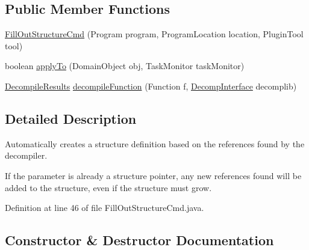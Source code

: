 \subsection*{Public Member Functions}
\begin{DoxyCompactItemize}
\item 
\mbox{\hyperlink{classghidra_1_1app_1_1plugin_1_1core_1_1decompile_1_1actions_1_1_fill_out_structure_cmd_a8bf54e2766774f1e16f1efac916bb947}{Fill\+Out\+Structure\+Cmd}} (Program program, Program\+Location location, Plugin\+Tool tool)
\item 
boolean \mbox{\hyperlink{classghidra_1_1app_1_1plugin_1_1core_1_1decompile_1_1actions_1_1_fill_out_structure_cmd_a42a968c8b0faa75882024395bd0eadd2}{apply\+To}} (Domain\+Object obj, Task\+Monitor task\+Monitor)
\item 
\mbox{\hyperlink{classghidra_1_1app_1_1decompiler_1_1_decompile_results}{Decompile\+Results}} \mbox{\hyperlink{classghidra_1_1app_1_1plugin_1_1core_1_1decompile_1_1actions_1_1_fill_out_structure_cmd_ad1fdf8d5d8ee9586bfec86f62469c212}{decompile\+Function}} (Function f, \mbox{\hyperlink{classghidra_1_1app_1_1decompiler_1_1_decomp_interface}{Decomp\+Interface}} decomplib)
\end{DoxyCompactItemize}


\subsection{Detailed Description}
Automatically creates a structure definition based on the references found by the decompiler.

If the parameter is already a structure pointer, any new references found will be added to the structure, even if the structure must grow. 

Definition at line 46 of file Fill\+Out\+Structure\+Cmd.\+java.



\subsection{Constructor \& Destructor Documentation}
\mbox{\label{classghidra_1_1app_1_1plugin_1_1core_1_1decompile_1_1actions_1_1_fill_out_structure_cmd_a8bf54e2766774f1e16f1efac916bb947}} 
